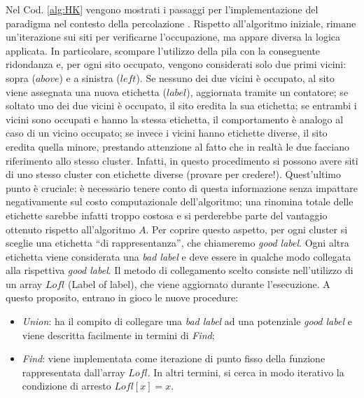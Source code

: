 Nel Cod. \ref{alg:HK} vengono mostrati i passaggi per l'implementazione 
del paradigma nel contesto della percolazione \cite{pseudoHK}.
Rispetto all'algoritmo iniziale, rimane un'iterazione sui siti per verificarne
l'occupazione, ma appare diversa la logica applicata. In particolare, scompare
l'utilizzo della pila con la conseguente ridondanza e, per 
ogni sito occupato, vengono considerati solo due primi vicini: sopra (\textit{$above$}) 
e a sinistra ($left$). Se nessuno dei due vicini è occupato, al sito 
viene assegnata una nuova etichetta ($label$), aggiornata tramite un contatore;
se soltato uno dei due vicini è occupato, il sito eredita la sua etichetta;
se entrambi i vicini sono occupati e hanno la stessa etichetta, il comportamento
è analogo al caso di un vicino occupato; se invece i vicini hanno etichette diverse, 
il sito eredita quella minore, prestando attenzione al fatto che in realtà 
le due facciano riferimento allo stesso cluster.
Infatti, in questo procedimento si possono avere siti di uno 
stesso cluster con etichette diverse (provare per credere!).
Quest'ultimo punto è cruciale: è necessario tenere conto di questa informazione
senza impattare negativamente sul costo computazionale dell'algoritmo; una rinomina
totale delle etichette sarebbe infatti troppo costosa e si perderebbe parte del vantaggio
ottenuto rispetto all'algoritmo $A$.
Per coprire questo aspetto, per ogni cluster si sceglie una etichetta 
``di rappresentanza'', che chiameremo \textit{good label}. Ogni altra etichetta viene 
considerata una \textit{bad label} e deve essere in qualche modo collegata alla rispettiva
\textit{good label}. Il metodo di collegamento scelto consiste nell'utilizzo di un array 
$Lofl$ (Label of label), che viene aggiornato durante l'esecuzione. 
A questo proposito, entrano in gioco le nuove procedure:
\begin{itemize}
    \item \textit{Union}: ha il compito di collegare una \textit{bad label} ad una 
    potenziale\footnotemark{} \textit{good label} e viene descritta facilmente in termini di \textit{Find};
    \item \textit{Find}: viene implementata come iterazione di punto fisso 
        della funzione rappresentata dall'array $Lofl$. In 
        altri termini, si cerca in modo iterativo la condizione di arresto $Lofl[x]=x$.
\end{itemize}


